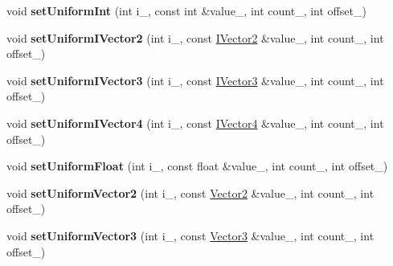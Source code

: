 \begin{DoxyCompactItemize}
\item 
void {\bfseries set\+Uniform\+Int} (int i\+\_\+, const int \&value\+\_\+, int count\+\_, int offset\+\_)\hypertarget{class_magnum_1_1_g_x_shader_program2_a1c98dba38418021f1c02302c28ffb16f}{}\label{class_magnum_1_1_g_x_shader_program2_a1c98dba38418021f1c02302c28ffb16f}

\item 
void {\bfseries set\+Uniform\+I\+Vector2} (int i\+\_\+, const \hyperlink{class_i_dream_sky_1_1_i_vector2}{I\+Vector2} \&value\+\_\+, int count\+\_, int offset\+\_)\hypertarget{class_magnum_1_1_g_x_shader_program2_af55fa6d8853ce87e905b03897591afd8}{}\label{class_magnum_1_1_g_x_shader_program2_af55fa6d8853ce87e905b03897591afd8}

\item 
void {\bfseries set\+Uniform\+I\+Vector3} (int i\+\_\+, const \hyperlink{class_i_dream_sky_1_1_i_vector3}{I\+Vector3} \&value\+\_\+, int count\+\_, int offset\+\_)\hypertarget{class_magnum_1_1_g_x_shader_program2_adcdbc4f1fb47fec23ee93e784bdbb23f}{}\label{class_magnum_1_1_g_x_shader_program2_adcdbc4f1fb47fec23ee93e784bdbb23f}

\item 
void {\bfseries set\+Uniform\+I\+Vector4} (int i\+\_\+, const \hyperlink{class_i_dream_sky_1_1_i_vector4}{I\+Vector4} \&value\+\_\+, int count\+\_, int offset\+\_)\hypertarget{class_magnum_1_1_g_x_shader_program2_afba560a98771c038f2031b54fa32956b}{}\label{class_magnum_1_1_g_x_shader_program2_afba560a98771c038f2031b54fa32956b}

\item 
void {\bfseries set\+Uniform\+Float} (int i\+\_\+, const float \&value\+\_\+, int count\+\_, int offset\+\_)\hypertarget{class_magnum_1_1_g_x_shader_program2_a9facfa1eab4cbac3b908311c5b70cfc8}{}\label{class_magnum_1_1_g_x_shader_program2_a9facfa1eab4cbac3b908311c5b70cfc8}

\item 
void {\bfseries set\+Uniform\+Vector2} (int i\+\_\+, const \hyperlink{class_i_dream_sky_1_1_vector2}{Vector2} \&value\+\_\+, int count\+\_, int offset\+\_)\hypertarget{class_magnum_1_1_g_x_shader_program2_ada109e9a70b7699861382e48964db916}{}\label{class_magnum_1_1_g_x_shader_program2_ada109e9a70b7699861382e48964db916}

\item 
void {\bfseries set\+Uniform\+Vector3} (int i\+\_\+, const \hyperlink{class_i_dream_sky_1_1_vector3}{Vector3} \&value\+\_\+, int count\+\_, int offset\+\_)\hypertarget{class_magnum_1_1_g_x_shader_program2_a87cfe7ed408d57ad06bc221a5b30b9e4}{}\label{class_magnum_1_1_g_x_shader_program2_a87cfe7ed408d57ad06bc221a5b30b9e4}


\end{DoxyCompactItemize}
